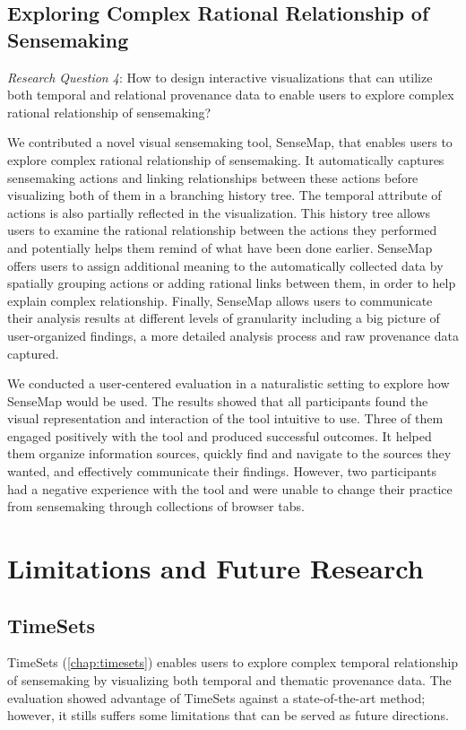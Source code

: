 \subsection{Exploring Complex Rational Relationship of Sensemaking}
\emph{Research Question 4}: How to design interactive visualizations that can utilize both temporal and relational provenance data to enable users to explore complex rational relationship of sensemaking?

We contributed a novel visual sensemaking tool, SenseMap, that enables users to explore complex rational relationship of sensemaking. It automatically captures sensemaking actions and linking relationships between these actions before visualizing both of them in a branching history tree. The temporal attribute of actions is also partially reflected in the visualization. This history tree allows users to examine the rational relationship between the actions they performed and potentially helps them remind of what have been done earlier. SenseMap offers users to assign additional meaning to the automatically collected data by spatially grouping actions or adding rational links between them, in order to help explain complex relationship. Finally, SenseMap allows users to communicate their analysis results at different levels of granularity including a big picture of user-organized findings, a more detailed analysis process and raw provenance data captured. 

We conducted a user-centered evaluation in a naturalistic setting to explore how SenseMap would be used. The results showed that all participants found the visual representation and interaction of the tool intuitive to use. Three of them engaged positively with the tool and produced successful outcomes. It helped them organize information sources, quickly find and navigate to the sources they wanted, and effectively communicate their findings. However, two participants had a negative experience with the tool and were unable to change their practice from sensemaking through collections of browser tabs.

\section{Limitations and Future Research}

\subsection{TimeSets}
TimeSets (\autoref{chap:timesets}) enables users to explore complex temporal relationship of sensemaking by visualizing both temporal and thematic provenance data. The evaluation showed advantage of TimeSets against a state-of-the-art method; however, it stills suffers some limitations that can be served as future directions.

